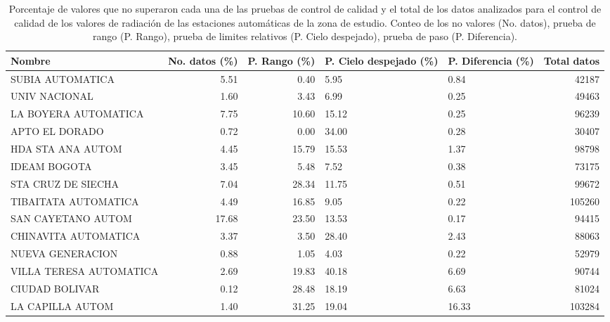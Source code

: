 \begin{table}[H]
\begin{center}

\caption{Porcentaje de valores que no superaron cada una de las pruebas de control de calidad y el total de los datos analizados para el control de calidad de los valores de radiación de las estaciones automáticas de la zona de estudio. Conteo de los no valores (No. datos), prueba de rango (P. Rango), prueba de limites relativos (P. Cielo despejado), prueba de paso (P. Diferencia).}
\begin{tabular}{p{3cm}rrp{3cm}p{3cm}r}
\toprule
      Nombre &  No. datos (\%) &  P. Rango (\%) &  P. Cielo despejado (\%) &  P. Diferencia (\%) & Total datos \\
\midrule
         SUBIA AUTOMATICA &       5.51 &      0.40 &                5.95 &           0.84 &         42187 \\
           UNIV NACIONAL &       1.60 &      3.43 &                6.99 &           0.25 &         49463 \\
    LA BOYERA AUTOMATICA &       7.75 &     10.60 &               15.12 &           0.25 &         96239 \\
          APTO EL DORADO &       0.72 &      0.00 &               34.00 &           0.28 &         30407 \\
       HDA STA ANA AUTOM &       4.45 &     15.79 &               15.53 &           1.37 &         98798 \\
            IDEAM BOGOTA &       3.45 &      5.48 &                7.52 &           0.38 &         73175 \\
      STA CRUZ DE SIECHA &       7.04 &     28.34 &               11.75 &           0.51 &         99672 \\
    TIBAITATA AUTOMATICA &       4.49 &     16.85 &                9.05 &           0.22 &        105260 \\
      SAN CAYETANO AUTOM &      17.68 &     23.50 &               13.53 &           0.17 &         94415 \\
    CHINAVITA AUTOMATICA &       3.37 &      3.50 &               28.40 &           2.43 &         88063 \\
        NUEVA GENERACION &       0.88 &      1.05 &                4.03 &           0.22 &         52979 \\
 VILLA TERESA AUTOMATICA &       2.69 &     19.83 &               40.18 &           6.69 &         90744 \\
          CIUDAD BOLIVAR &       0.12 &     28.48 &               18.19 &           6.63 &         81024 \\
        LA CAPILLA AUTOM &       1.40 &     31.25 &               19.04 &          16.33 &        103284 \\
\bottomrule
\end{tabular}		
		\label{tabla:val_radiacion}
\end{center}
\end{table}

